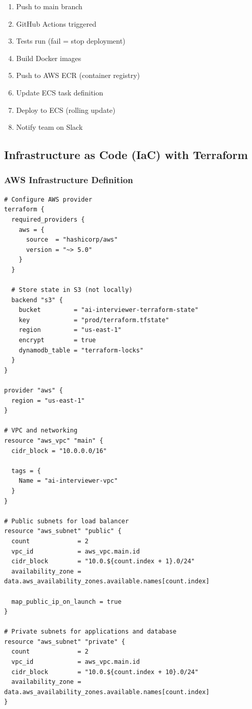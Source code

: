 \documentclass[12pt,a4paper,oneside]{article}
\begin{document}
{{\begin{enumerate}
    \item Push to main branch
    \item GitHub Actions triggered
    \item Tests run (fail = stop deployment)
    \item Build Docker images
    \item Push to AWS ECR (container registry)
    \item Update ECS task definition
    \item Deploy to ECS (rolling update)
    \item Notify team on Slack
\end{enumerate}

\subsection{Infrastructure as Code (IaC) with Terraform}

\subsubsection{AWS Infrastructure Definition}

\begin{lstlisting}[language=HCL, caption=terraform/main.tf]
# Configure AWS provider
terraform {
  required_providers {
    aws = {
      source  = "hashicorp/aws"
      version = "~> 5.0"
    }
  }
  
  # Store state in S3 (not locally)
  backend "s3" {
    bucket         = "ai-interviewer-terraform-state"
    key            = "prod/terraform.tfstate"
    region         = "us-east-1"
    encrypt        = true
    dynamodb_table = "terraform-locks"
  }
}

provider "aws" {
  region = "us-east-1"
}

# VPC and networking
resource "aws_vpc" "main" {
  cidr_block = "10.0.0.0/16"
  
  tags = {
    Name = "ai-interviewer-vpc"
  }
}

# Public subnets for load balancer
resource "aws_subnet" "public" {
  count             = 2
  vpc_id            = aws_vpc.main.id
  cidr_block        = "10.0.${count.index + 1}.0/24"
  availability_zone = data.aws_availability_zones.available.names[count.index]
  
  map_public_ip_on_launch = true
}

# Private subnets for applications and database
resource "aws_subnet" "private" {
  count             = 2
  vpc_id            = aws_vpc.main.id
  cidr_block        = "10.0.${count.index + 10}.0/24"
  availability_zone = data.aws_availability_zones.available.names[count.index]
}


\end{lstlisting}}}
\end{document}
